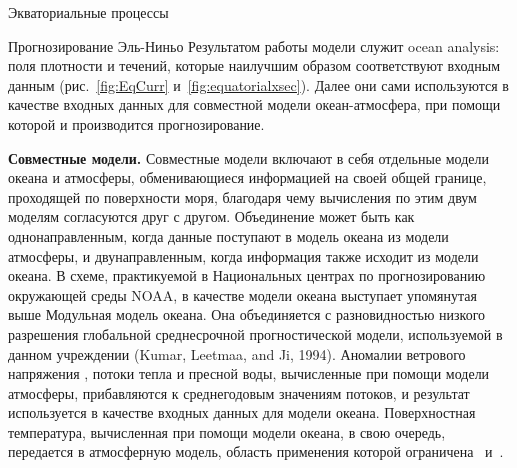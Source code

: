 \begin{chapter}{Экваториальные процессы}
\begin{section}{Прогнозирование Эль-Ниньо}
Результатом работы модели служит ocean analysis: поля плотности и течений, 
которые наилучшим образом соответствуют входным данным
(рис.~\ref{fig:EqCurr} и~\ref{fig:equatorialxsec}). Далее они сами используются
в качестве входных данных для совместной модели океан-атмосфера, при помощи
которой и производится прогнозирование.
%

\textbf{Совместные модели.} Совместные модели%
%
%
включают в себя отдельные модели океана и атмосферы, обменивающиеся информацией
на своей общей границе, проходящей по поверхности моря, благодаря чему
вычисления по этим двум моделям согласуются друг с другом. Объединение может
быть как однонаправленным, когда данные поступают в модель океана из модели
атмосферы, и двунаправленным, когда информация также исходит из модели океана.
В схеме, практикуемой в Национальных центрах по прогнозированию 
окружающей среды NOAA, в качестве модели океана выступает упомянутая выше
Модульная модель океана. Она объединяется с разновидностью низкого разрешения 
глобальной среднесрочной прогностической модели, используемой в данном 
учреждении (Kumar, Leetmaa, and Ji, 1994). 
Аномалии ветрового напряжения%
, потоки тепла и пресной воды, вычисленные
при помощи модели атмосферы, прибавляются к среднегодовым значениям потоков,
и результат используется в качестве входных данных для модели океана. 
Поверхностная температура, вычисленная при помощи модели океана, в свою
очередь, передается в атмосферную модель, область применения которой
ограничена~ и~.
%


\end{section}
\end{chapter}

